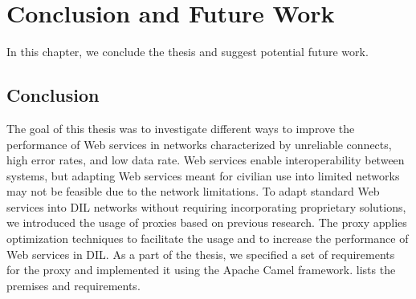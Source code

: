 \chapter{Conclusion and Future Work}
\label{chapter:conclusion}

In this chapter, we conclude the thesis and suggest potential future work.

\section{Conclusion}

The goal of this thesis was to investigate different ways to improve the
performance of Web services in networks characterized by unreliable connects,
high error rates, and low data rate. Web services enable interoperability
between systems, but adapting Web services meant for civilian use into limited
networks may not be feasible due to the network limitations. To adapt standard
Web services into DIL networks without requiring incorporating proprietary
solutions, we introduced the usage of proxies based on previous research. The
proxy applies optimization techniques to facilitate the usage and to increase
the performance of Web services in DIL. As a part of the thesis, we specified a
set of requirements for the proxy and implemented it using the Apache Camel
framework.  lists the premises and
requirements.

